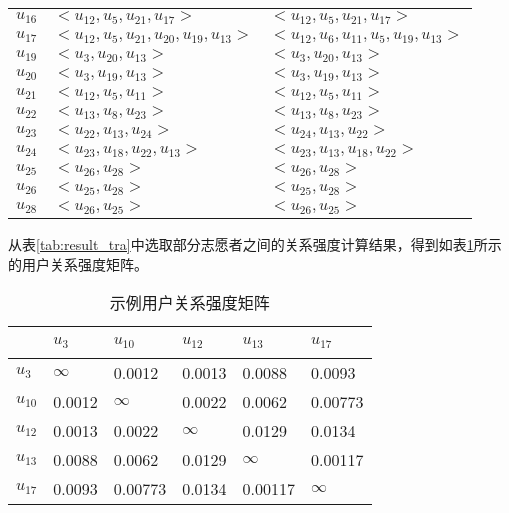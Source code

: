 \begin{table}[htbp]
\begin{tabular}{cll}
      \mbox{$u_{16}$} &\mbox{$ <u_{12},u_{5},u_{21},u_{17}>$} &\mbox{$ <u_{12},u_{5},u_{21},u_{17}>$} \\
      \mbox{$u_{17} $}& \mbox{$< u_{12},u_{5},u_{21},u_{20},u_{19},u_{13}   >$} & \mbox{$< u_{12},u_{6},u_{11},u_{5},u_{19},u_{13}   >$}\\
      \mbox{$u_{19} $}&\mbox{$ <u_{3},u_{20},u_{13}>$} &\mbox{$ <u_{3},u_{20},u_{13}>$}\\
      \mbox{$u_{20}$} & \mbox{$<u_{3},u_{19},u_{13}>$} & \mbox{$<u_{3},u_{19},u_{13}>$}\\
      \mbox{$u_{21}$} & \mbox{$ <u_{12},u_{5},u_{11}>$} & \mbox{$ <u_{12},u_{5},u_{11}>$}\\
      \mbox{$u_{22} $}& \mbox{$ <u_{13},u_{8},u_{23}>$} & \mbox{$ <u_{13},u_{8},u_{23}>$}\\
      \mbox{$u_{23}$} & \mbox{$ <u_{22},u_{13},u_{24}>$} & \mbox{$ <u_{24},u_{13},u_{22}>$}\\
      \mbox{$u_{24}$} &\mbox{$ <u_{23},u_{18},u_{22},u_{13}>$} &\mbox{$ <u_{23},u_{13},u_{18},u_{22}>$}\\
      \mbox{$u_{25} $}&\mbox{$ <u_{26},u_{28}>$} &\mbox{$ <u_{26},u_{28}>$}\\
      \mbox{$u_{26} $}&\mbox{$ <u_{25},u_{28}>$} &\mbox{$ <u_{25},u_{28}>$}\\
      \mbox{$u_{28}$} &\mbox{$ <u_{26},u_{25}>$} &\mbox{$ <u_{26},u_{25}>$}\\
      \bottomrule[1.5pt]
    \end{tabular}
\end{table}

\par 从表\ref{tab:result_tra}中选取部分志愿者之间的关系强度计算结果，得到如表\ref{tra_matrix}所示的用户关系强度矩阵。
\begin{table}[htbp]
\caption{示例用户关系强度矩阵}
\label{tra_matrix}
	\centering
    \begin{tabular}{|p{1.3cm}|p{1.3cm}|p{1.3cm}|p{1.3cm}|p{1.3cm}|p{1.3cm}|}
    \toprule[1.5pt]
    \hline
           ~ & $u_{3}$ & $u_{10}$ & $u_{12}$ & $u_{13}$ & $u_{17}$ \\
    \hline
     $u_{3}$ & $\infty $ & 0.0012 & 0.0013 & 0.0088 & 0.0093\\
     \hline
    $u_{10}$ & 0.0012& $\infty $  & 0.0022 & 0.0062 & 0.00773 \\
    \hline
    $u_{12}$ & 0.0013 & 0.0022 & $\infty $  & 0.0129 & 0.0134 \\
    \hline
    $u_{13}$ & 0.0088 & 0.0062 & 0.0129 & $\infty $  & 0.00117 \\
    \hline
    $u_{17}$ & 0.0093 & 0.00773 & 0.0134 & 0.00117 & $\infty $  \\
    \hline
    \end{tabular}
\end{table}

